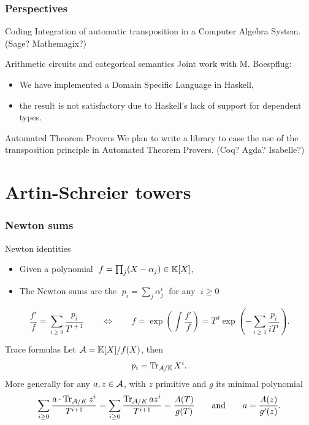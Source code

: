 \documentclass[10pt]{beamer}
\begin{document}

\begin{frame}
  \frametitle{Perspectives}
  
  \begin{block}{Coding}
    Integration of automatic transposition in a Computer Algebra
    System. (Sage?  Mathemagix?)
  \end{block}

  \begin{block}{Arithmetic circuits and categorical semantics}
    Joint work with M. Boespflug:
    \begin{itemize}
    \item We have implemented a Domain Specific Language in Haskell,
    \item the result is not satisfactory due to Haskell's lack of
      support for dependent types.
    \end{itemize}
  \end{block}

  \begin{block}{Automated Theorem Provers}
    We plan to write a library to ease the use of the transposition
    principle in Automated Theorem Provers. (Coq? Agda? Isabelle?)
  \end{block}
\end{frame}


\section{Artin-Schreier towers}

\begin{frame}
  \frametitle{Newton sums}

  \begin{block}{Newton identities}
    \begin{itemize}
    \item Given a polynomial $\;f = \prod_j(X-\alpha_j)\in\mathbb{K}[X]$,
    \item The Newton sums are the $\;p_i = \sum_j\alpha_j^i\;$ for any $\;i\ge0$
    \end{itemize}
    \[\frac{f'}{f} = \sum_{i\ge0}\frac{p_i}{T^{i+1}} 
    \qquad\Leftrightarrow\qquad
    f = \exp\left(\int\frac{f'}{f}\right) = T^d\exp\left(-\sum_{i\ge1}\frac{p_i}{iT^i}\right)
    \text{.}\]
  \end{block}

  \pause

  \begin{block}{Trace formulas}
    Let $\mathcal{A}=\mathbb{K}[X]/f(X)$, then
    \[p_i = \operatorname{Tr}_{\mathcal{A}/\mathbb{K}}X^i\text{.}\] More generally for any
    $a,z\in\mathcal{A}$, with $z$ primitive and $g$ its minimal
    polynomial
    \[\sum_{i\ge0}\frac{a\cdot\operatorname{Tr}_{\mathcal{A}/K}z^i}{T^{i+1}} = 
    \sum_{i\ge0}\frac{\operatorname{Tr}_{\mathcal{A}/K}az^i}{T^{i+1}} = \frac{A(T)}{g(T)}
    \qquad\text{and}\qquad
    a = \frac{A(z)}{g'(z)}
    \text{.}\]
  \end{block}
\end{frame}
\end{document}
